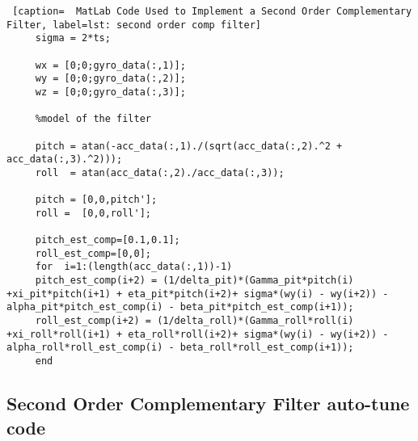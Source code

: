 \begin{lstlisting} [caption=  MatLab Code Used to Implement a Second Order Complementary Filter, label=lst: second order comp filter]
     sigma = 2*ts;
     
     wx = [0;0;gyro_data(:,1)];
     wy = [0;0;gyro_data(:,2)];
     wz = [0;0;gyro_data(:,3)];
     
     %model of the filter
     
     pitch = atan(-acc_data(:,1)./(sqrt(acc_data(:,2).^2 + acc_data(:,3).^2))); 
     roll  = atan(acc_data(:,2)./acc_data(:,3));    
     
     pitch = [0,0,pitch'];
     roll =  [0,0,roll'];
     
     pitch_est_comp=[0.1,0.1];
     roll_est_comp=[0,0];
     for  i=1:(length(acc_data(:,1))-1)
     pitch_est_comp(i+2) = (1/delta_pit)*(Gamma_pit*pitch(i) +xi_pit*pitch(i+1) + eta_pit*pitch(i+2)+ sigma*(wy(i) - wy(i+2)) -alpha_pit*pitch_est_comp(i) - beta_pit*pitch_est_comp(i+1)); 
     roll_est_comp(i+2) = (1/delta_roll)*(Gamma_roll*roll(i) +xi_roll*roll(i+1) + eta_roll*roll(i+2)+ sigma*(wy(i) - wy(i+2)) -alpha_roll*roll_est_comp(i) - beta_roll*roll_est_comp(i+1)); 
     end
      \end{lstlisting}
      
   
   
      \subsection{Second Order Complementary Filter auto-tune code}\label{sec: auto-tune code}
      
